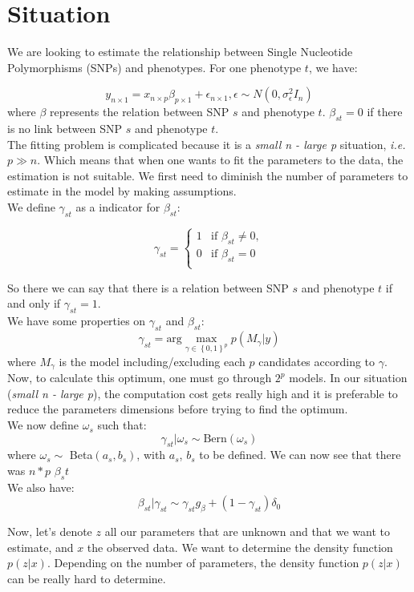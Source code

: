 \section{Situation}
We are looking to estimate the relationship between Single Nucleotide Polymorphisms (SNPs) and phenotypes. For one phenotype $t$, we have:

\begin{equation}
y_{n \times 1} = x_{n\times p} \beta_{p\times 1} + \epsilon_{n \times 1},  \epsilon \sim N \left( 0, \sigma_{\epsilon}^2I_n \right)
\label{eq:model}
\end{equation}
where $\beta$ represents the relation between SNP $s$ and phenotype $t$. $\beta_{st} = 0$ if there is no link between SNP $s$ and phenotype $t$.\\
\newline
The fitting problem is complicated because it is a\textit{ small n - large p }situation, \textit{i.e.} $p \gg n$. Which means that when one wants to fit the parameters to the data, the estimation is not suitable. We first need to diminish the number of parameters to estimate in the model by making assumptions.\\
\newline
We define $\gamma_{st}$ as a indicator for $\beta_{st}$:

\begin{equation}
\gamma_{st} = \left\lbrace \begin{array}{ll}
1 & \text{if } \beta_{st} \neq 0,\\
0 & \text{if } \beta_{st}  = 0\\
\end{array}\right.
\label{eq:gamma}
\end{equation}

So there we can say that there is a relation between SNP $s$ and phenotype $t$ if and only if $\gamma_{st} = 1$.\\
We have some properties on $\gamma_{st}$ and $\beta_{st}$:
\begin{equation}
\gamma_{st} = \text{arg} \max_{\gamma \in \left\lbrace0,1\right\rbrace^p}p(M_\gamma|y)
\end{equation}
where $M_\gamma$ is the model including/excluding each $p$ candidates according to $\gamma$. \\
Now, to calculate this optimum, one must go through $2^p$ models. In our situation (\textit{small n - large p}), the computation cost gets really high and it is preferable to reduce the parameters dimensions before trying to find the optimum.\\
\newline
We now define $\omega_s$ such that:
\begin{equation}
\gamma_{st} | \omega_s \sim \text{Bern}(\omega_s)
\label{eq:omega}
\end{equation}
where $\omega_s\sim $ Beta$(a_s,b_s)$, with $a_s$, $b_s$ to be defined. We can now see that there was $n*p$ $\beta_st$ \\
\newline
We also have:
\begin{equation}
\beta_{st} | \gamma_{st} \sim \gamma_{st} g_{\beta} + (1-\gamma_{st})\delta_0
\label{eq:spikenslab}
\end{equation}

Now, let's denote $z$ all our parameters that are unknown and that we want to estimate, and $x$ the observed data. We want to determine the density function $p(z|x)$. Depending on the number of parameters, the density function $p(z|x)$ can be really hard to determine.